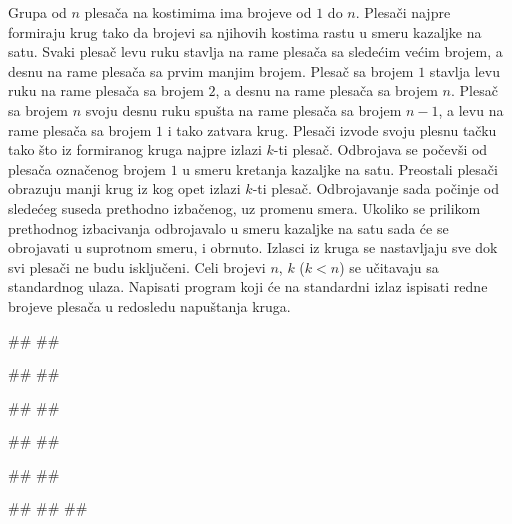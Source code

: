 \begin{Exercise}[difficulty=1,label=613]
Grupa od $n$ plesača na kostimima ima brojeve od $1$ do $n$. 
Plesači najpre formiraju krug tako da brojevi sa njihovih kostima rastu u smeru kazaljke na satu. Svaki plesač levu ruku stavlja na rame plesača sa sledećim većim brojem, a desnu na rame plesača sa prvim manjim brojem. Plesač sa brojem $1$ stavlja levu ruku na rame plesača sa brojem $2$, a desnu na rame plesača sa brojem $n$. Plesač sa brojem $n$ svoju desnu ruku spušta na rame plesača sa brojem $n-1$, a levu na rame plesača sa brojem $1$ i tako zatvara krug.
Plesači izvode svoju plesnu tačku tako što iz formiranog kruga najpre izlazi $k$-ti plesač.
Odbrojava se počevši od plesača označenog brojem $1$ u smeru kretanja kazaljke na satu. 
Preostali plesači obrazuju manji krug iz kog opet izlazi $k$-ti plesač. Odbrojavanje sada počinje od
sledećeg suseda prethodno izbačenog, uz promenu smera. Ukoliko se prilikom prethodnog izbacivanja odbrojavalo 
u smeru kazaljke na satu sada će se obrojavati u suprotnom smeru, i obrnuto. Izlasci iz kruga se nastavljaju
sve dok svi plesači ne budu isključeni. 
Celi brojevi $n$, $k$ ($k < n$) se učitavaju sa standardnog ulaza. 
Napisati program koji će na standardni izlaz ispisati redne brojeve plesača u redosledu napuštanja kruga. 

\begin{minitest}
\begin{test}{1}
#\naslovUlaz#
##

#\naslovIzlaz# 
##
\end{test}
\end{minitest}
\begin{minitest}
\begin{test}{2}
#\naslovUlaz#
##

#\naslovIzlaz# 
## 
\end{test}
\end{minitest}
\begin{minitest}
\begin{test}{3}
#\naslovUlaz#
##

#\naslovIzlazZaGresku# 
##
##
\end{test}
\end{minitest}
\end{Exercise}

